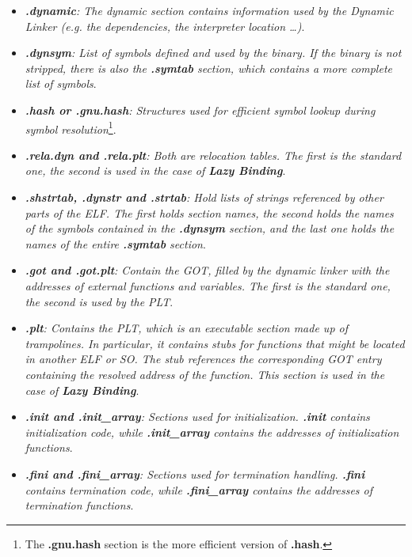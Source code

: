     \begin{itemize}
        \item \textit{\textbf{.dynamic}: The dynamic section contains information used by the Dynamic Linker 
            (e.g. the dependencies, the interpreter location \dots)}.
        \item \textit{\textbf{.dynsym}: List of symbols defined and used by the binary. 
            If the binary is not stripped, there is also the \textbf{.symtab} section, which contains a more complete list of symbols}.
        \item \textit{\textbf{.hash or .gnu.hash}: Structures used for efficient symbol lookup during symbol resolution}\footnote{
            The \textbf{.gnu.hash} section is the more efficient version of \textbf{.hash}.
        }.
        \item \textit{\textbf{.rela.dyn and .rela.plt}: Both are relocation tables. The first is the standard one, 
        the second is used in the case of \textbf{Lazy Binding}}.
        \item \textit{\textbf{.shstrtab, .dynstr and .strtab}: Hold lists of strings referenced by other parts of the \gls{ELF}.
            The first holds section names, the second holds the names of the symbols contained in the \textbf{.dynsym} section, 
            and the last one holds the names of the entire \textbf{.symtab} section}.
        \item \textit{\textbf{.got and .got.plt}: Contain the \gls{GOT}, filled by the dynamic linker with the 
            addresses of external functions and variables. The first is the standard one, the second is used by the \gls{PLT}}.
        \item \textit{\textbf{.plt}: Contains the \gls{PLT}, which is an executable section made up of trampolines. In particular, it 
            contains stubs for functions that might be located in another \gls{ELF} or \gls{SO}. 
            The stub references the corresponding \gls{GOT} entry containing the resolved address of the function.
            This section is used in the case of \textbf{Lazy Binding}}.
        \item \textit{\textbf{.init and .init\_array}: Sections used for initialization. \textbf{.init} contains initialization code, 
            while \textbf{.init\_array} contains the addresses of initialization functions}.
        \item \textit{\textbf{.fini and .fini\_array}: Sections used for termination handling. 
            \textbf{.fini} contains termination code, 
            while \textbf{.fini\_array} contains the addresses of termination functions}.
    \end{itemize}
